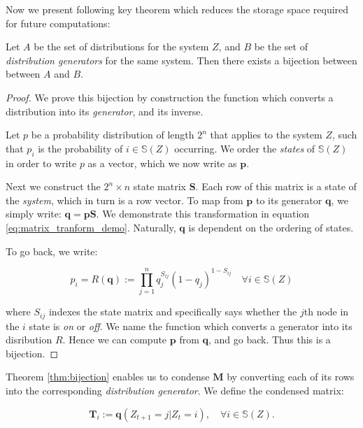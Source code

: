 Now we present following key theorem which reduces the storage space required for future computations:

\begin{theorem}
	\label{thm:bijection}
	Let $A$ be the set of distributions for the system $Z$, and $B$ be the set of \textit{distribution generators} for the same system. Then there exists a bijection between between $A$ and $B$.
\end{theorem}

\begin{proof}
	We prove this bijection by construction the function which converts a distribution into its \textit{generator}, and its inverse.
	
	Let $p$ be a probability distribution of length $2^n$ that applies to the system $Z$, such that $p_i$ is the probability of $i \in \mathbb{S}(Z)$ occurring. We order the \textit{states} of $\mathbb{S}(Z)$ in order to write $p$ as a vector, which we now write as $\mathbf{p}$. 
	
	Next we construct the $2^n \times n$ state matrix $\mathbf{S}$. Each row of this matrix is a state of the \textit{system}, which in turn is a row vector. To map from $\mathbf{p}$ to its generator $\mathbf{q}$, we simply write: $\mathbf{q} = \mathbf{p} \mathbf{S}$. We demonstrate this transformation in equation \ref{eq:matrix_tranform_demo}. Naturally, $\mathbf{q}$ is dependent on the ordering of states.
	
	To go back, we write:
	
	\begin{equation}
	\label{eq:map_inv}
	p_i = R(\mathbf{q}) := \prod \limits_{j=1}^{n} q_j^{S_{ij}} (1-q_j)^{1-S_{ij}}\quad \forall i \in \mathbb{S}(Z)
	\end{equation}
	
	where  $S_{ij}$  indexes the state matrix and specifically says whether the $j$th node in the $i$ state is \textit{on} or \textit{off}. We name the function which converts a generator into its disribution $R$. Hence we can compute $\mathbf{p}$ from $\mathbf{q}$, and go back. Thus this is a bijection.
\end{proof}

Theorem \ref{thm:bijection} enables us to condense $\mathbf{M}$ by converting each of its rows into the corresponding \textit{distribution generator}. We define the condensed matrix:

\begin{equation}
\label{def:generators}
\mathbf{T}_{i} := \mathbf{q}(Z_{t+1} = j| Z_t = i) , \quad \forall i \in \mathbb{S}(Z).
\end{equation}

